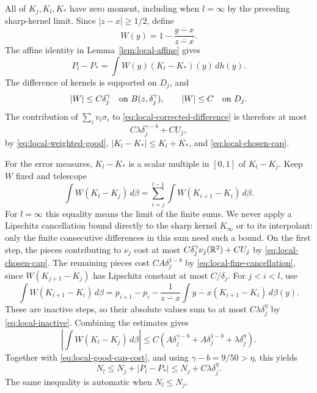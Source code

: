 All of $K_j,K_l,K_*$ have zero moment, including when $l=\infty$
by the preceding sharp-kernel limit. Since $|z-x|\ge1/2$, define
\[
W(y)=1-\frac{\overline{y-x}}{\overline{z-x}}.
\]
The affine identity in Lemma~\ref{lem:local-affine} gives
\begin{equation}\label{eq:local-corrected-difference}
P_l-P_* =\int W(y)(K_l-K_*)(y)\,dh(y).
\end{equation}
The difference of kernels is supported on $D_j$, and
\[
|W|\le C\delta_j^\gamma\quad\hbox{on }B(z,\delta_j^\gamma),
\qquad |W|\le C\quad\hbox{on }D_j.
\]
The contribution of $\sum_i v_i\sigma_i$ to
\eqref{eq:local-corrected-difference} is therefore at most
\begin{equation}\label{eq:local-good-cap-cost}
C\lambda\delta_j^{\gamma-b}+C U_j,
\end{equation}
by \eqref{eq:local-weighted-good},
$|K_l-K_*|\le K_l+K_*$, and \eqref{eq:local-chosen-cap}.

For the error measures, $K_l-K_*$ is a scalar multiple in $[0,1]$
of $K_l-K_j$. Keep $W$ fixed and telescope
\begin{equation}\label{eq:local-error-telescoping}
\int W(K_l-K_j)\,d\beta
 =\sum_{i=j}^{l-1}\int W(K_{i+1}-K_i)\,d\beta.
\end{equation}
For $l=\infty$ this equality means the limit of the finite sums.
We never apply a Lipschitz cancellation bound directly to the sharp
kernel $K_\infty$ or to its interpolant: only the finite consecutive
differences in this sum need such a bound.
On the first step, the pieces contributing to $\nu_j$ cost at most
$C\delta_j^\gamma\nu_j(\mathbb R^2)+CU_j$ by
\eqref{eq:local-chosen-cap}. The remaining pieces cost
$CA\delta_j^{1-b}$ by \eqref{eq:local-fine-cancellation}, since
$W(K_{j+1}-K_j)$ has Lipschitz constant at most $C/\delta_j$.
For $j<i<l$, use
\[
\int W(K_{i+1}-K_i)\,d\beta
 =p_{i+1}-p_i-\frac1{\overline{z-x}}
       \int\overline{y-x}(K_{i+1}-K_i)\,d\beta(y).
\]
These are inactive steps, so their absolute values sum to at most
$C\lambda\delta_j^\eta$ by \eqref{eq:local-inactive}.
Combining the estimates gives
\[
\left|\int W(K_l-K_j)\,d\beta\right|
 \le C\left(A\delta_j^{\gamma-b}
       +A\delta_j^{1-b}+\lambda\delta_j^\eta\right).
\]
Together with \eqref{eq:local-good-cap-cost}, and using
$\gamma-b=9/50>\eta$, this yields
\begin{equation}\label{eq:local-active-increment}
N_l\le N_j+|P_l-P_*|\le N_j+C\lambda\delta_j^\eta.
\end{equation}
The same inequality is automatic when $N_l\le N_j$.

